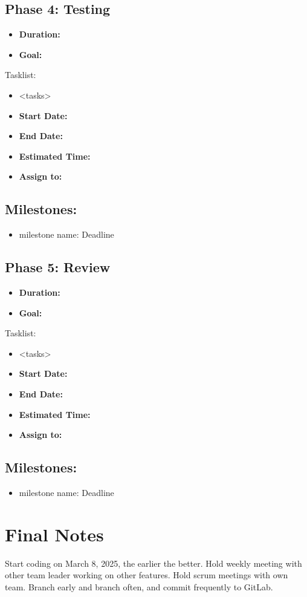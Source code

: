 \documentclass{report}
\begin{document}
\subsection*{Phase 4: Testing}
\begin{itemize}
    \item \textbf{Duration:} 
    \item \textbf{Goal:} 
\end{itemize}
Tasklist:
\begin{itemize}
    \item <tasks>
    \item \textbf{Start Date:} 
    \item \textbf{End Date:}
    \item \textbf{Estimated Time:}
    \item \textbf{Assign to:}
\end{itemize}
\subsection*{Milestones:}
\begin{itemize}
    \item milestone name: Deadline
\end{itemize}
\subsection*{Phase 5: Review}
\begin{itemize}
    \item \textbf{Duration:} 
    \item \textbf{Goal:} 
\end{itemize}
Tasklist:
\begin{itemize}
    \item <tasks>
    \item \textbf{Start Date:} 
    \item \textbf{End Date:}
    \item \textbf{Estimated Time:}
    \item \textbf{Assign to:}
\end{itemize}
\subsection*{Milestones:}
\begin{itemize}
    \item milestone name: Deadline
\end{itemize}

\section*{Final Notes}
Start coding on March 8, 2025, the earlier the better. Hold weekly meeting with other team leader working on other features.
Hold scrum meetings with own team. Branch early and branch often, and commit frequently to GitLab.
\end{document}
